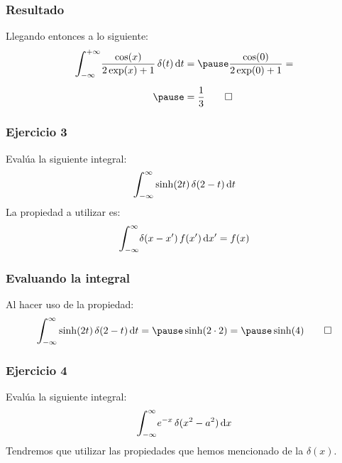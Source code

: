 \documentclass[12pt]{beamer}
\begin{document}
\begin{frame}
\frametitle{Resultado}
Llegando entonces a lo siguiente:
\pause
\begin{eqnarray*}
\begin{aligned}
\scaleint{6ex}_{\bs -\infty}^{+\infty} \dfrac{\cos (x)}{2 \exp(x) + 1} \, \delta (t) \dd{t} &= \pause \dfrac{\cos (0)}{2 \exp (0) + 1} = \\[0.5em] \pause
&= \dfrac{1}{3} \qed
\end{aligned}
\end{eqnarray*}
\end{frame}

\begin{frame}
\frametitle{Ejercicio 3}
Evalúa la siguiente integral:
\pause
\begin{align*}
\scaleint{6ex}_{\bs -\infty}^{\infty} \sinh (2 t) \, \delta (2 - t) \dd{t}
\end{align*}
\pause
La propiedad a utilizar es:
\pause
\begin{align*}
\scaleint{6ex}_{\bs -\infty}^{\infty} \delta (x - \pderivada{x}) \, f (\pderivada{x}) \dd{\pderivada{x}} = f (x)
\end{align*}
\end{frame}

\begin{frame}
\frametitle{Evaluando la integral}
Al hacer uso de la propiedad:
\pause
\begin{eqnarray*}
\begin{aligned}
\scaleint{6ex}_{\bs -\infty}^{\infty} \sinh (2 t) \, \delta (2 - t) \dd{t} = \pause \sinh (2 \cdot 2) = \pause \sinh (4) \qed
\end{aligned}
\end{eqnarray*}
\end{frame}

\begin{frame}
\frametitle{Ejercicio 4}
Evalúa la siguiente integral:
\pause
\begin{align*}
\scaleint{6ex}_{\bs -\infty}^{\infty} e^{-x} \, \delta(x^{2} - a^{2}) \dd{x}
\end{align*}
\pause
Tendremos que utilizar las propiedades que hemos mencionado de la $\delta (x)$.
\end{frame}
\end{document}
